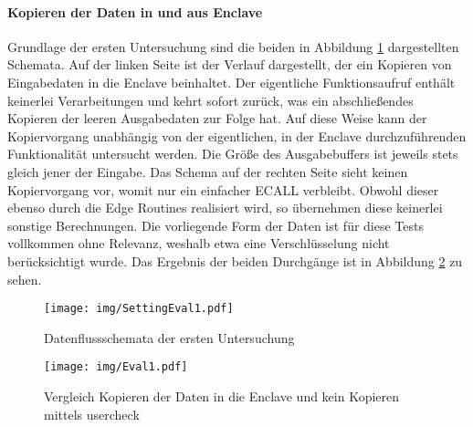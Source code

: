 \paragraph{Kopieren der Daten in und aus Enclave}

Grundlage der ersten Untersuchung sind die beiden in Abbildung \ref{fig:settingeval1} dargestellten Schemata. Auf der linken Seite ist der Verlauf dargestellt, der ein Kopieren von Eingabedaten in die Enclave beinhaltet. Der eigentliche Funktionsaufruf enthält keinerlei Verarbeitungen und kehrt sofort zurück, was ein abschließendes Kopieren der leeren Ausgabedaten zur Folge hat. Auf diese Weise kann der Kopiervorgang unabhängig von der eigentlichen, in der Enclave durchzuführenden Funktionalität untersucht werden. Die Größe des Ausgabebuffers ist jeweils stets gleich jener der Eingabe. Das Schema auf der rechten Seite sieht keinen Kopiervorgang vor, womit nur ein einfacher ECALL verbleibt. Obwohl dieser ebenso durch die Edge Routines realisiert wird, so übernehmen diese keinerlei sonstige Berechnungen. Die vorliegende Form der Daten ist für diese Tests vollkommen ohne Relevanz, weshalb etwa eine Verschlüsselung nicht berücksichtigt wurde. Das Ergebnis der beiden Durchgänge ist in Abbildung \ref{fig:eval1} zu sehen.

\begin{figure}[h]
	\texttt{[image: img/SettingEval1.pdf]}
	\centering
	\caption{Datenflussschemata der ersten Untersuchung}
	\label{fig:settingeval1}
\end{figure}

\begin{figure}[h]
	\texttt{[image: img/Eval1.pdf]}
	\centering
	\caption{Vergleich Kopieren der Daten in die Enclave und kein Kopieren mittels user\textunderscore check}
	\label{fig:eval1}
\end{figure}

